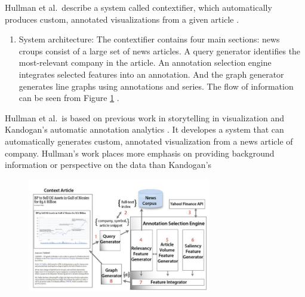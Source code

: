 \documentclass{egpubl}
\begin{document}
Hullman et al.\ describe a system called contextifier, which automatically produces custom, annotated visualizations from a given article \cite{hullman2013}. 
\begin{enumerate}
\item System architecture: The contextifier contains four main sections: news croups consist of a large set of news articles. A query generator identifies the most-relevant company in the article. An annotation selection engine integrates selected features into an annotation. And the graph generator generates line graphs using annotations and series. The flow of information can be seen from Figure \ref{fig:hullman2013} \cite{hullman2013}.
\end{enumerate}
Hullman et al.\ is based on previous work in storytelling in visualization \cite{segal} and Kandogan's automatic annotation analytics \cite{kandogan2012}. It developes a system that can automatically generates custom, annotated visualization from a news article of company. Hullman's work places more emphasis on providing background information or perspective on the data than Kandogan's \cite{kandogan2012}
\begin{figure}
\begingroup
\centering
\includegraphics[width=8cm]{./images/hullman2013}
\label{fig:hullman2013}
\endgroup
\end{figure}
\end{document}
